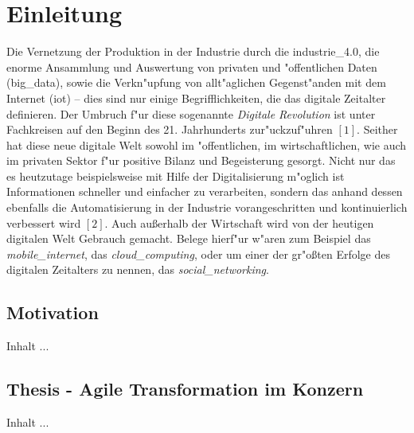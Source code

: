 
\chapter{Einleitung}
\minitoc
\vspace{1 cm} 

Die Vernetzung der Produktion in der Industrie durch die \gls{industrie_4.0}, die enorme Ansammlung und Auswertung von privaten und "offentlichen Daten (\gls{big_data}), sowie die Verkn"upfung von allt"aglichen Gegenst"anden mit dem Internet (\gls{iot}) -- dies sind nur einige Begrifflichkeiten, die das digitale Zeitalter definieren. Der Umbruch f"ur diese sogenannte \textit{Digitale Revolution} ist unter Fachkreisen auf den Beginn des 21. Jahrhunderts zur"uckzuf"uhren \([1]\). Seither hat diese neue digitale Welt sowohl im "offentlichen, im wirtschaftlichen, wie auch im privaten Sektor f"ur positive Bilanz und Begeisterung gesorgt. Nicht nur das es heutzutage beispielsweise mit Hilfe der Digitalisierung m"oglich ist Informationen schneller und einfacher zu verarbeiten, sondern das anhand dessen ebenfalls die Automatisierung in der Industrie vorangeschritten und kontinuierlich verbessert wird \([2]\). Auch au\ss{}erhalb der Wirtschaft wird von der heutigen digitalen Welt Gebrauch gemacht. Belege hierf"ur w"aren zum Beispiel das \textit{\gls{mobile_internet}}, das \textit{\gls{cloud_computing}}, oder
um einer der gr"o\ss{}ten Erfolge des digitalen Zeitalters zu nennen, das \textit{\gls{social_networking}}. 


\section{Motivation}
Inhalt ...

\section{Thesis - Agile Transformation im Konzern}
Inhalt ...



